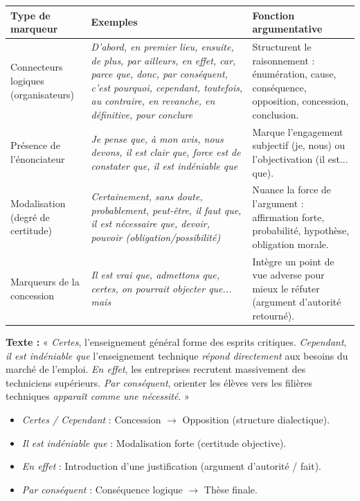 \documentclass[11pt]{article}
\newcommand{\cle}[1]{{\popxbold\color{popdark}#1}}
\begin{document}
\begin{center}
\begin{tabularx}{\linewidth}{|l|X|X|}\hline
\rowcolor{popblueL}
\textbf{Type de marqueur} & \textbf{Exemples} & \textbf{Fonction argumentative} \\ \hline
\cle{Connecteurs logiques} (organisateurs) & \emph{D'abord, en premier lieu, ensuite, de plus, par ailleurs, en effet, car, parce que, donc, par conséquent, c'est pourquoi, cependant, toutefois, au contraire, en revanche, en définitive, pour conclure} & Structurent le raisonnement : énumération, cause, conséquence, opposition, concession, conclusion. \\ \hline
\cle{Présence de l'énonciateur} & \emph{Je pense que, à mon avis, nous devons, il est clair que, force est de constater que, il est indéniable que} & Marque l'engagement subjectif (je, nous) ou l'objectivation (il est... que). \\ \hline
\cle{Modalisation} (degré de certitude) & \emph{Certainement, sans doute, probablement, peut-être, il faut que, il est nécessaire que, devoir, pouvoir (obligation/possibilité)} & Nuance la force de l'argument : affirmation forte, probabilité, hypothèse, obligation morale. \\ \hline
\cle{Marqueurs de la concession} & \emph{Il est vrai que, admettons que, certes, on pourrait objecter que... mais} & Intègre un point de vue adverse pour mieux le réfuter (argument d'autorité retourné). \\ \hline
\end{tabularx}
\end{center}

\begin{exemplebox}
\textbf{Texte :} « \emph{Certes}, l'enseignement général forme des esprits critiques. \emph{Cependant}, \emph{il est indéniable que} l'enseignement technique \emph{répond directement} aux besoins du marché de l'emploi. \emph{En effet}, les entreprises recrutent massivement des techniciens supérieurs. \emph{Par conséquent}, orienter les élèves vers les filières techniques \emph{apparaît comme une nécessité}. »

\begin{itemize}
    \item \emph{Certes / Cependant} : Concession $\rightarrow$ Opposition (structure dialectique).
    \item \emph{Il est indéniable que} : Modalisation forte (certitude objective).
    \item \emph{En effet} : Introduction d'une justification (argument d'autorité / fait).
    \item \emph{Par conséquent} : Conséquence logique $\rightarrow$ Thèse finale.
\end{itemize}
\end{exemplebox}
\end{document}
